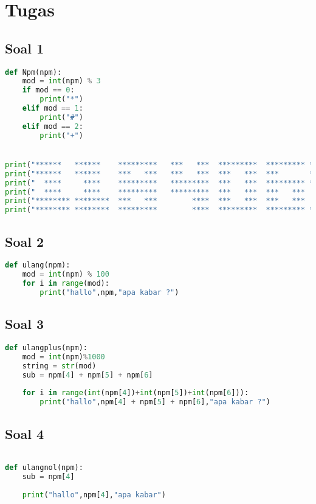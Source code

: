 \chapter{Tugas}
\section*{Soal 1}
\begin{lstlisting}[language=Python]
def Npm(npm):
    mod = int(npm) % 3 
    if mod == 0:
        print("*")
    elif mod == 1:
        print("#")
    elif mod == 2:
        print("+")


print("******   ******    *********   ***   ***  *********  ********* ********* ")
print("******   ******    ***   ***   ***   ***  ***   ***  ***       ***   *** ")
print("  ****     ****    *********   *********  ***   ***  ********* ********* ")
print("  ****     ****    *********   *********  ***   ***  ***   ***       *** ")
print("******** ********  ***   ***        ****  ***   ***  ***   ***       *** ")
print("******** ********  *********        ****  *********  ********* ********* ")

\end{lstlisting}

\section*{Soal 2}
\begin{lstlisting}[language=Python]
def ulang(npm):
    mod = int(npm) % 100
    for i in range(mod):
        print("hallo",npm,"apa kabar ?")

\end{lstlisting}

\section*{Soal 3}
\begin{lstlisting}[language=Python]
def ulangplus(npm):
    mod = int(npm)%1000
    string = str(mod)
    sub = npm[4] + npm[5] + npm[6]
    
    for i in range(int(npm[4])+int(npm[5])+int(npm[6])):
        print("hallo",npm[4] + npm[5] + npm[6],"apa kabar ?")


\end{lstlisting}
\section*{Soal 4}
\begin{lstlisting}[language=Python]

def ulangnol(npm):
    sub = npm[4]
        
    print("hallo",npm[4],"apa kabar")

\end{lstlisting}
